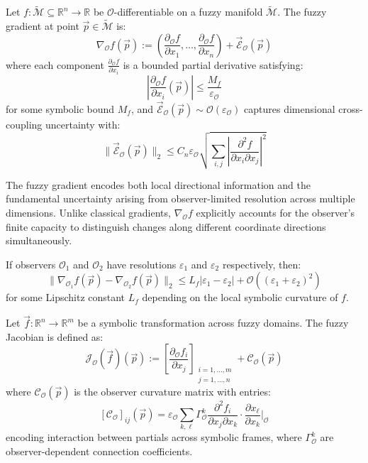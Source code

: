 \begin{definition}
\label{definition:bk4_fuzzy_gradient}
Let $f : \tilde{\mathcal{M}} \subseteq \mathbb{R}^n \to \mathbb{R}$ be $\mathcal{O}$-differentiable on a fuzzy manifold $\tilde{\mathcal{M}}$. The fuzzy gradient at point $\vec{p} \in \tilde{\mathcal{M}}$ is:
\[
\nabla_{\mathcal{O}} f(\vec{p}) := 
\left(
\frac{\partial_{\mathcal{O}} f}{\partial x_1}, 
\dots, 
\frac{\partial_{\mathcal{O}} f}{\partial x_n}
\right)
+ \vec{\mathcal{E}}_{\mathcal{O}}(\vec{p})
\]
where each component $\frac{\partial_{\mathcal{O}} f}{\partial x_i}$ is a bounded partial derivative satisfying:
\[
\left|\frac{\partial_{\mathcal{O}} f}{\partial x_i}(\vec{p})\right| \leq \frac{M_f}{\varepsilon_{\mathcal{O}}}
\]
for some symbolic bound $M_f$, and $\vec{\mathcal{E}}_{\mathcal{O}}(\vec{p}) \sim \mathcal{O}(\varepsilon_{\mathcal{O}})$ captures dimensional cross-coupling uncertainty with:
\[
\|\vec{\mathcal{E}}_{\mathcal{O}}(\vec{p})\|_2 \leq C_n \varepsilon_{\mathcal{O}} \sqrt{\sum_{i,j} \left|\frac{\partial^2 f}{\partial x_i \partial x_j}\right|^2}
\]
\end{definition}

The fuzzy gradient encodes both local directional information and the fundamental uncertainty arising from observer-limited resolution across multiple dimensions. Unlike classical gradients, $\nabla_{\mathcal{O}} f$ explicitly accounts for the observer's finite capacity to distinguish changes along different coordinate directions simultaneously.

\begin{lemma}
\label{lemma:gradient_stability}
If observers $\mathcal{O}_1$ and $\mathcal{O}_2$ have resolutions $\varepsilon_1$ and $\varepsilon_2$ respectively, then:
\[
\|\nabla_{\mathcal{O}_1} f(\vec{p}) - \nabla_{\mathcal{O}_2} f(\vec{p})\|_2 \leq L_f |\varepsilon_1 - \varepsilon_2| + \mathcal{O}((\varepsilon_1 + \varepsilon_2)^2)
\]
for some Lipschitz constant $L_f$ depending on the local symbolic curvature of $f$.
\end{lemma}


\begin{theorem}
\label{theorem:bk4_fuzzy_jacobian}
Let $\vec{f} : \mathbb{R}^n \to \mathbb{R}^m$ be a symbolic transformation across fuzzy domains. The fuzzy Jacobian is defined as:
\[
\mathcal{J}_{\mathcal{O}}(\vec{f})(\vec{p}) := 
\left[ 
\frac{\partial_{\mathcal{O}} f_i}{\partial x_j}
\right]_{\substack{i=1,\ldots,m \\ j=1,\ldots,n}}
+ 
\mathcal{C}_{\mathcal{O}}(\vec{p})
\]
where $\mathcal{C}_{\mathcal{O}}(\vec{p})$ is the observer curvature matrix with entries:
\[
[\mathcal{C}_{\mathcal{O}}]_{ij}(\vec{p}) = \varepsilon_{\mathcal{O}} \sum_{k,\ell} \Gamma^k_{\mathcal{O}} \frac{\partial^2 f_i}{\partial x_j \partial x_k} \cdot \frac{\partial x_\ell}{\partial x_k}\bigg|_{\mathcal{O}}
\]
encoding interaction between partials across symbolic frames, where $\Gamma^k_{\mathcal{O}}$ are observer-dependent connection coefficients.
\end{theorem}

